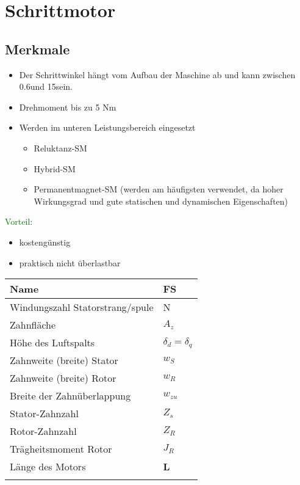 \section{Schrittmotor}
\subsection{Merkmale}
    \begin{itemize}
        \item Der Schrittwinkel hängt vom Aufbau der Maschine ab und kann zwischen 0.6\textdegree  und 15\textdegree  sein.
        \item Drehmoment bis zu 5 Nm
        \item Werden im unteren Leistungsbereich eingesetzt
        \begin{itemize}
            \item Reluktanz-SM
            \item Hybrid-SM
            \item Permanentmagnet-SM (werden am häufigsten verwendet, da hoher Wirkungsgrad und gute statischen und dynamischen Eigenschaften)
        \end{itemize}
    \end{itemize}
    \textcolor{green}{Vorteil}:
    \begin{itemize}
        \item kostengünstig
        \item praktisch nicht überlastbar
    \end{itemize}
    \renewcommand{\arraystretch}{2}
    \begin{tabularx}{0.43\linewidth}{|X|l|}
        \hline 
        \textbf{Name}&\textbf{FS} \\
        \hline
        Windungszahl Statorstrang/spule&N  \\ 
        \hline 
        Zahnfläche&$ A_z $  \\ 
        \hline
        Höhe des Luftspalts& $ \delta_{d} = \delta_{q}$ \\ 
        \hline 
        Zahnweite (breite) Stator& $ w_S $  \\ 
        \hline
        Zahnweite (breite) Rotor& $ w_R $ \\
        \hline 
        Breite der Zahnüberlappung&  $ w_{zu} $ \\ 
        \hline
        Stator-Zahnzahl& $  Z_s $\\
        \hline
        Rotor-Zahnzahl&$ Z_R $ \\
        \hline 
        Trägheitsmoment Rotor& $ J_R $ \\
        \hline
        Länge des Motors&\textbf{L} \\
        \hline         
        & \\
        \hline                           
    \end{tabularx}
